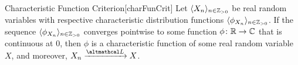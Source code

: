 \documentclass[../probability.tex]{subfiles}
\begin{document}
\begin{Theorem}{Characteristic Function Criterion}[charFunCrit]
    Let \(\lang X_n \rang_{n \in \ZZ_{>0}}\)
    be real random variables with respective characteristic distribution functions
    \(\lang \phi_{X_n} \rang_{n \in \ZZ_{>0}}\).
    If the sequence \(\lang \phi_{X_n} \rang_{n \in \ZZ_{>0}}\) converges
    pointwise to some function \(\phi \colon \RR \to \CC\)
    that is continuous at \(0\), then \(\phi\) is a characteristic function
    of some real random variable \(X\), and moreover, \(X_n \lawconv X\).
\end{Theorem}
\end{document}
